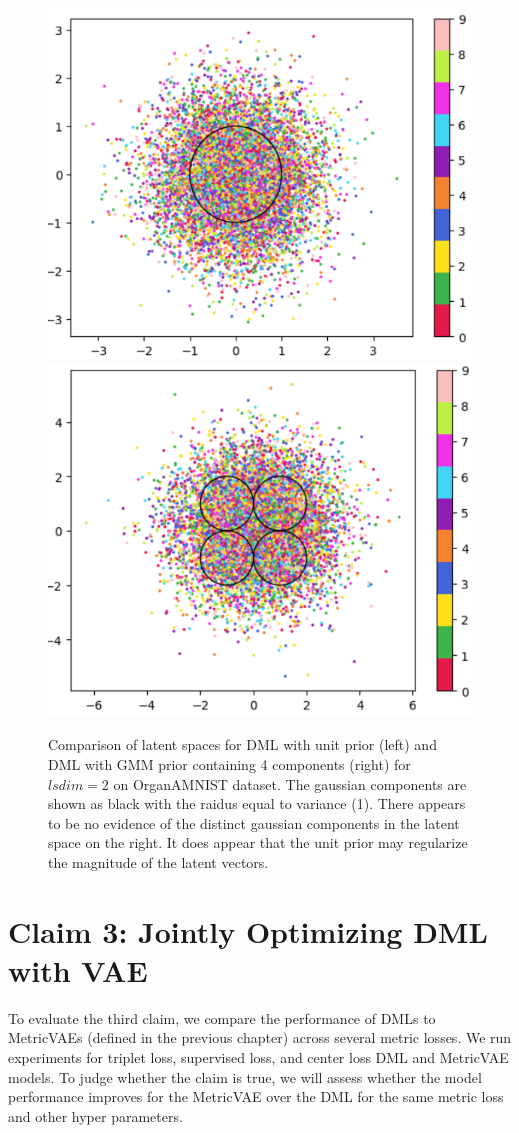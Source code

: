 \documentclass[./dissertation.tex]{subfiles}
\begin{document}
   \begin{figure}
       \centering
       \includegraphics[width=.48\textwidth]{figures/1_component.PNG}
       \includegraphics[width=.48\textwidth]{figures/4_components.PNG}
       \caption{Comparison of latent spaces for DML with unit prior (left) and DML with GMM prior containing 4 components (right) for $lsdim = 2$ on OrganAMNIST dataset. The gaussian components are shown as black with the raidus equal to variance (1). There appears to be no evidence of the distinct gaussian components in the latent space on the right. It does appear that the unit prior may regularize the magnitude of the latent vectors.}
       \label{fig:my_label}
   \end{figure}
   
    \section{Claim 3: Jointly Optimizing DML with VAE}
    To evaluate the third claim, we compare the performance of DMLs to MetricVAEs (defined in the previous chapter) across several metric losses. We run experiments for triplet loss, supervised loss, and center loss DML and MetricVAE models. To judge whether the claim is true, we will assess whether the model performance improves for the MetricVAE over the DML for the same metric loss and other hyper parameters. 
    
\end{document}
